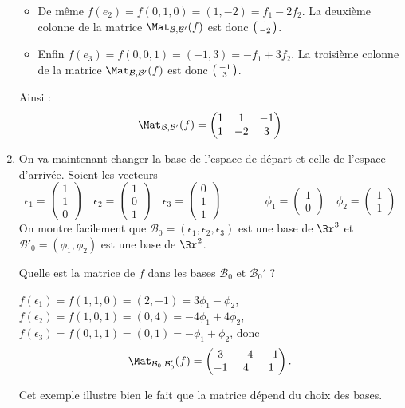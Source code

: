 \documentclass[class=report,crop=false]{standalone}
\begin{document}
\begin{exemple}
\begin{enumerate}
\begin{itemize}
    \item De même $f(e_2) = f(0,1,0) =(1,-2)=f_1-2f_2$.
    La deuxième colonne de la matrice $\Mat_{\mathcal{B},\mathcal{B}'}(f)$
    est donc $\left(\begin{smallmatrix}1\cr-2\cr\end{smallmatrix}\right)$.

    \item Enfin $f(e_3) = f(0,0,1) =(-1,3)=-f_1+3f_2$.
    La troisième colonne de la matrice $\Mat_{\mathcal{B},\mathcal{B}'}(f)$
    est donc $\left(\begin{smallmatrix}-1\cr3\cr\end{smallmatrix}\right)$.
  \end{itemize}

  Ainsi :
  $$\Mat_{\mathcal{B},\mathcal{B}'}(f)
  = \begin{pmatrix} 1 & 1 & -1 \\ 1 & -2 & 3 \end{pmatrix}$$

  \item On va maintenant changer la base de l'espace de départ et
celle de l'espace d'arrivée. Soient les vecteurs
$$\epsilon_1 = \begin{pmatrix}1\\1\\0\end{pmatrix} \quad
\epsilon_2 = \begin{pmatrix}1 \\ 0 \\ 1 \end{pmatrix} \quad
\epsilon_3 = \begin{pmatrix}0 \\ 1 \\ 1 \end{pmatrix} \qquad\qquad
\phi_1 = \begin{pmatrix}1\\0\end{pmatrix} \quad
\phi_2 = \begin{pmatrix}1\\1\end{pmatrix}$$
On montre facilement que $\mathcal{B}_0 =(\epsilon_1,\epsilon_2,\epsilon_3)$
est une base de $\Rr^3$ et $\mathcal{B}'_0 =(\phi_1,\phi_2)$
est une base de $\Rr^2$.

Quelle est la matrice de $f$ dans les bases $\mathcal{B}_0$
et $\mathcal{B}_0'$ ?


$f(\epsilon_1) = f(1,1,0) = (2,-1) = 3\phi_1-\phi_2$,
$f(\epsilon_2) = f(1,0,1) = (0,4) = -4\phi_1+4\phi_2$,
$f(\epsilon_3) = f(0,1,1) = (0,1) = -\phi_1+\phi_2$, donc
$$\Mat_{\mathcal{B}_0,\mathcal{B}_0'}(f)
  = \begin{pmatrix} 3 & -4 & -1 \\ -1 & 4 & 1 \end{pmatrix}.$$

Cet exemple illustre bien le fait que la matrice dépend du choix des
bases.
\end{enumerate}


\end{exemple}
\end{document}
